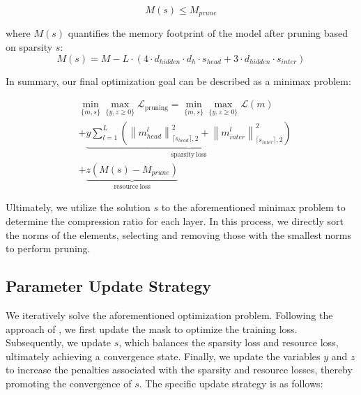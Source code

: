 \begin{equation*}
M(s) \leq M_{prune}
\end{equation*}


where \( {M}(s) \) quantifies the memory footprint of the model after pruning based on sparsity \( s \):
{
\small
\begin{equation*}
M(s) = M - L \cdot (4 \cdot d_{hidden} \cdot d_{h} \cdot s_{head} + 3 \cdot d_{hidden} \cdot s_{inter})
\end{equation*}
}


In summary, our final optimization goal can be described as a minimax problem:




\begin{align*} 
&\min_{\{m,s\}}\max_{\{y,z\geq0\}}\mathcal{L}_{\mathrm{pruning}} = \min_{\{m,s\}}\max_{\{y,z\geq0\}}\mathcal{L}(m) \\ & + \underbrace{y \sum_{l=1}^{L} \left( \left\|m_{head}^{l}\right\|_{\lceil s_{head} \rceil,2}^2 + \left\|m_{inter}^{l}\right\|_{\lceil s_{inter} \rceil,2}^2 \right)}_{\mathrm{sparsity~loss}} \\ & + \underbrace{z\left(M(s)-M_{prune}\right)}_{\mathrm{resource~loss}} 
\end{align*}



Ultimately, we utilize the solution $s$ to the aforementioned minimax problem to determine the compression ratio for each layer. In this process, we directly sort the norms of the elements, selecting and removing those with the smallest norms to perform pruning.

\subsection{Parameter Update Strategy} \label{Parameter Update Strategy}

We iteratively solve the aforementioned optimization problem. Following the approach of \cite{tono2017efficientdcalgorithmconstrained, Chen2023ResourceCM, yu2022unified}, we first update the mask to optimize the training loss. Subsequently, we update \( s \), which balances the sparsity loss and resource loss, ultimately achieving a convergence state. Finally, we update the variables \( y \) and \( z \) to increase the penalties associated with the sparsity and resource losses, thereby promoting the convergence of \( s \). The specific update strategy is as follows:

